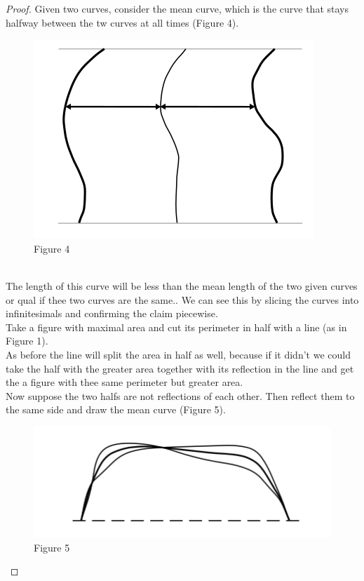 \documentclass[12pt, a4paper, titlepage]{article}
\begin{document}
\begin{proof}
Given two curves, consider the mean curve, which is the curve that stays halfway between the tw curves at all times (Figure 4). \\
\begin{figure}[h]
\includegraphics[scale=0.5]{images/Figure4}
\centering
Figure 4
\centering
\end{figure}
\\
The length of this curve will be less than the mean length of the two given curves or qual if thee two curves are the same.. We can see this by slicing the curves into infinitesimals and confirming the claim piecewise.\\
Take a figure with maximal area and cut its perimeter in half with a line (as in Figure 1).\\
As before the line will split the area in half as well, because if it didn't we could take the half with the greater area together with its reflection in the line and get the a figure with thee same perimeter but greater area.\\
Now suppose the two halfs are not reflections of each other. Then reflect them to the same side and draw the mean curve (Figure 5).\\
\begin{figure}[h]
\includegraphics[scale=0.5]{images/Figure5}
\centering
Figure 5
\centering
\end{figure}

\end{proof}
\end{document}
